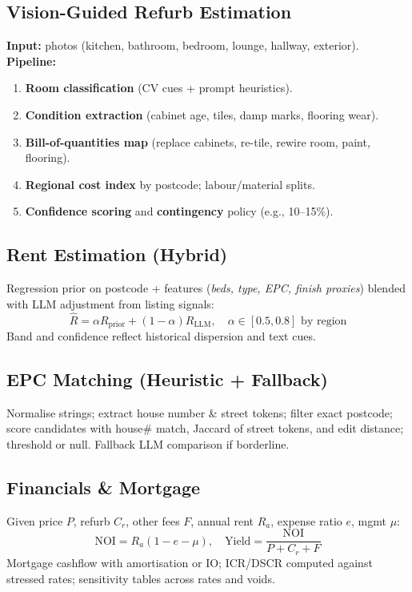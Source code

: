 \documentclass[12pt,a4paper]{article}
\begin{document}
\subsection{Vision-Guided Refurb Estimation}
\textbf{Input:} photos (kitchen, bathroom, bedroom, lounge, hallway, exterior). \\
\textbf{Pipeline:}
\begin{enumerate}[leftmargin=1.5em]
  \item \textbf{Room classification} (CV cues + prompt heuristics).
  \item \textbf{Condition extraction} (cabinet age, tiles, damp marks, flooring wear).
  \item \textbf{Bill-of-quantities map} (replace cabinets, re-tile, rewire room, paint, flooring).
  \item \textbf{Regional cost index} by postcode; labour/material splits.
  \item \textbf{Confidence scoring} and \textbf{contingency} policy (e.g., 10--15\%).
\end{enumerate}

\subsection{Rent Estimation (Hybrid)}
Regression prior on postcode + features (\emph{beds, type, EPC, finish proxies}) blended with LLM adjustment from listing signals:
\[
\hat{R} = \alpha R_{\text{prior}} + (1-\alpha)R_{\text{LLM}},\quad \alpha \in [0.5, 0.8] \text{ by region}
\]
Band and confidence reflect historical dispersion and text cues.

\subsection{EPC Matching (Heuristic + Fallback)}
Normalise strings; extract house number \& street tokens; filter exact postcode; score candidates with house\# match, Jaccard of street tokens, and edit distance; threshold or null. Fallback LLM comparison if borderline.

\subsection{Financials \& Mortgage}
Given price $P$, refurb $C_r$, other fees $F$, annual rent $R_a$, expense ratio $e$, mgmt $\mu$:
\[
\text{NOI} = R_a(1 - e - \mu),\quad
\text{Yield} = \frac{\text{NOI}}{P + C_r + F}
\]
Mortgage cashflow with amortisation or IO; ICR/DSCR computed against stressed rates; sensitivity tables across rates and voids.
\end{document}
